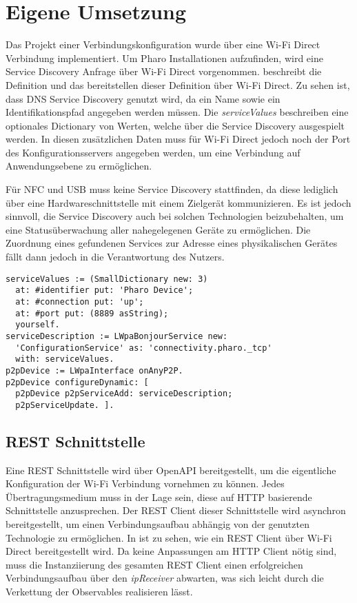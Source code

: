 \section{Eigene Umsetzung}
\label{section:implementation}
        Das Projekt einer Verbindungskonfiguration \cite{aiProject} wurde über eine Wi-Fi Direct Verbindung implementiert. Um Pharo Installationen aufzufinden, wird eine Service Discovery Anfrage über Wi-Fi Direct vorgenommen.  beschreibt die Definition und das bereitstellen dieser Definition über Wi-Fi Direct. Zu sehen ist, dass DNS Service Discovery genutzt wird, da ein Name sowie ein Identifikationspfad angegeben werden müssen. Die {\it serviceValues} beschreiben eine optionales Dictionary von Werten, welche über die Service Discovery ausgespielt werden. In diesen zusätzlichen Daten muss für Wi-Fi Direct jedoch noch der Port des Konfigurationsservers angegeben werden, um eine Verbindung auf Anwendungsebene zu ermöglichen.
        
        Für NFC und USB muss keine Service Discovery stattfinden, da diese lediglich über eine Hardwareschnittstelle mit einem Zielgerät kommunizieren. Es ist jedoch sinnvoll, die Service Discovery auch bei solchen Technologien beizubehalten, um eine Statusüberwachung aller nahegelegenen Geräte zu ermöglichen. Die Zuordnung eines gefundenen Services zur Adresse eines physikalischen Gerätes fällt dann jedoch in die Verantwortung des Nutzers.
        
        \begin{lstlisting}[frame=bt, label={lst:wifi:discovery}, language=Pharo, caption=Service Discovery Definition (Servercode in pharo)]
serviceValues := (SmallDictionary new: 3)
  at: #identifier put: 'Pharo Device';
  at: #connection put: 'up';
  at: #port put: (8889 asString);
  yourself.
serviceDescription := LWpaBonjourService new:
  'ConfigurationService' as: 'connectivity.pharo._tcp'
  with: serviceValues.
p2pDevice := LWpaInterface onAnyP2P.
p2pDevice configureDynamic: [ 
  p2pDevice p2pServiceAdd: serviceDescription;
  p2pServiceUpdate. ].
        \end{lstlisting}        
        
     \subsection{REST Schnittstelle}
        Eine REST Schnittstelle wird über OpenAPI bereitgestellt, um die eigentliche Konfiguration der Wi-Fi Verbindung vornehmen zu können. Jedes Übertragungsmedium muss in der Lage sein, diese auf HTTP basierende Schnittstelle anzusprechen. Der REST Client dieser Schnittstelle wird asynchron bereitgestellt, um einen \linebreak Verbindungsaufbau abhängig von der genutzten Technologie zu ermöglichen. In  ist zu sehen, wie ein REST Client über Wi-Fi Direct bereitgestellt wird. Da keine Anpassungen am HTTP Client nötig sind, muss die Instanziierung des gesamten REST Client einen erfolgreichen Verbindungsaufbau über den {\it ipReceiver} abwarten, was sich leicht durch die Verkettung der Observables realisieren lässt.
        
